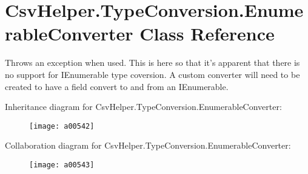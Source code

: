 \hypertarget{a00101}{\section{Csv\-Helper.\-Type\-Conversion.\-Enumerable\-Converter Class Reference}
\label{a00101}
}


Throws an exception when used. This is here so that it's apparent that there is no support for I\-Enumerable type coversion. A custom converter will need to be created to have a field convert to and from an I\-Enumerable.  




Inheritance diagram for Csv\-Helper.\-Type\-Conversion.\-Enumerable\-Converter\-:
\nopagebreak
\begin{figure}[H]
\begin{center}
\leavevmode
\texttt{[image: a00542]}
\end{center}
\end{figure}


Collaboration diagram for Csv\-Helper.\-Type\-Conversion.\-Enumerable\-Converter\-:
\nopagebreak
\begin{figure}[H]
\begin{center}
\leavevmode
\texttt{[image: a00543]}
\end{center}
\end{figure}
